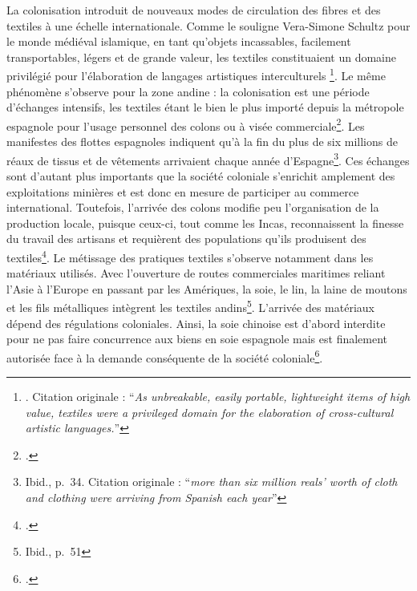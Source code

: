 La colonisation introduit de nouveaux modes de circulation des fibres et des textiles à une échelle internationale. Comme le souligne Vera-Simone Schultz pour le monde médiéval islamique, \og en tant qu'objets incassables, facilement transportables, légers et de grande valeur, les textiles constituaient un domaine privilégié pour l'élaboration de langages artistiques interculturels \fg \footnote{\cite[p.~96]{schulzCrossroadsClothTextile2016}. Citation originale : \textquotedblleft \textit{As unbreakable, easily portable, lightweight items of high value, textiles were a privileged domain for the elaboration of cross-cultural artistic languages.}\textquotedblright}. Le même phénomène s'observe pour la zone andine : la colonisation est une période d'échanges intensifs, les textiles étant le bien le plus importé depuis la métropole espagnole pour l'usage personnel des colons ou à visée commerciale\footcite[p.~33]{phippsIberianGlobe2013}. Les manifestes des flottes espagnoles indiquent qu'à la fin du   \og plus de six millions de réaux de tissus et de vêtements arrivaient chaque année d'Espagne\fg\footnote{Ibid., p.~34. Citation originale : \textquotedblleft \textit{more than six million reals' worth of cloth and clothing were arriving from Spanish each year}\textquotedblright}. Ces échanges sont d'autant plus importants que la société coloniale s'enrichit amplement des exploitations minières et est donc en mesure de participer au commerce international. Toutefois, l'arrivée des colons modifie peu l'organisation de la production locale, puisque ceux-ci, tout comme les Incas, reconnaissent la finesse du travail des artisans et requièrent des populations qu'ils produisent des textiles\footcite[p.~52]{nilesArtistEmpireInca1994}. Le métissage des pratiques textiles s'observe notamment dans les matériaux utilisés. Avec l'ouverture de routes commerciales maritimes reliant l'Asie à l'Europe en passant par les Amériques, la soie, le lin, la laine de moutons et les fils métalliques intègrent les textiles andins\footnote{Ibid., p.~51}.
L'arrivée des matériaux dépend des régulations coloniales. Ainsi, la soie chinoise est d'abord interdite pour ne pas faire concurrence aux biens en soie espagnole mais est finalement autorisée face à la demande conséquente de la société coloniale\footcite[p.~34]{phippsIberianGlobe2013}. \\

